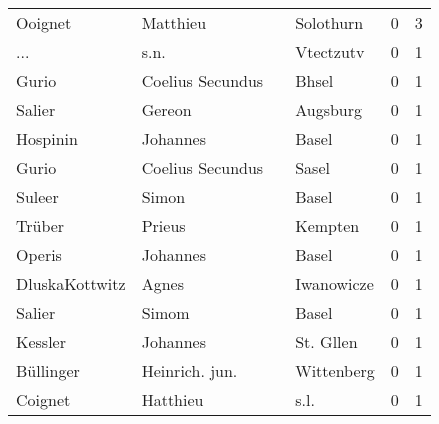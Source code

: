 \begin{center}
\begin{tiny}
\begin{longtabu}{llllrr}
                  Ooignet &                           Matthieu &             &                                   Solothurn &          0 &         3 \\
                      ... &                               s.n. &             &                                   Vtectzutv &          0 &         1 \\
                    Gurio &                   Coelius Secundus &             &                                       Bhsel &          0 &         1 \\
                   Salier &                             Gereon &             &                                    Augsburg &          0 &         1 \\
                 Hospinin &                           Johannes &             &                                       Basel &          0 &         1 \\
                    Gurio &                   Coelius Secundus &             &                                       Sasel &          0 &         1 \\
                   Suleer &                              Simon &             &                                       Basel &          0 &         1 \\
                   Trüber &                             Prieus &             &                                     Kempten &          0 &         1 \\
                   Operis &                           Johannes &             &                                       Basel &          0 &         1 \\
           DluskaKottwitz &                              Agnes &             &                                  Iwanowicze &          0 &         1 \\
                   Salier &                              Simom &             &                                       Basel &          0 &         1 \\
                  Kessler &                           Johannes &             &                                   St. Gllen &          0 &         1 \\
                Büllinger &                     Heinrich. jun. &             &                                  Wittenberg &          0 &         1 \\
                  Coignet &                           Hatthieu &             &                                        s.l. &          0 &         1 \\

\end{longtabu}
\end{tiny}
\end{center}
